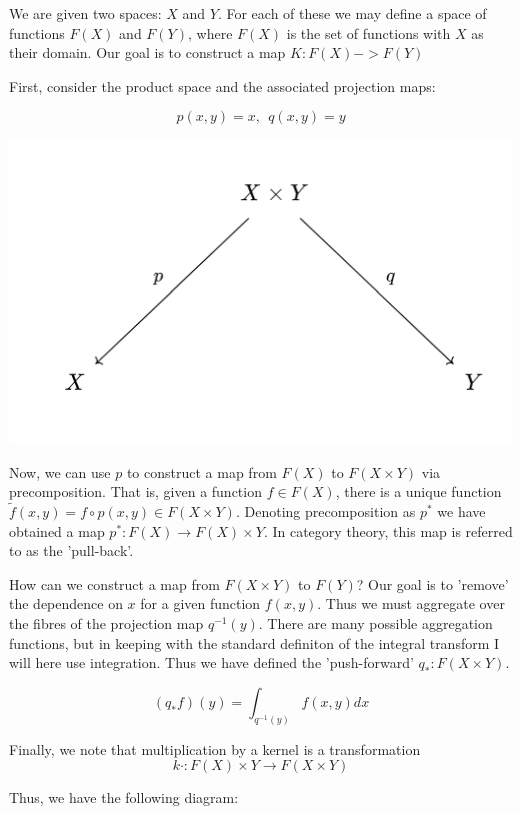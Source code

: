 \documentclass[11pt]{article}
\begin{document}
We are given two spaces: $X$ and $Y$. For each of these we may define a space of functions $F(X)$ and $F(Y)$, where $F(X)$ is the set of functions with $X$ as their domain. Our goal is to construct a map $K: F(X) -> F(Y)$

First, consider the product space and the associated projection maps:

$$ p(x, y) = x, \ \  q(x, y) = y$$

\pagebreak

\includegraphics[scale=0.4]{basic_span.png}

Now, we can use $p$ to construct a map from $F(X)$ to $F(X\times Y)$ via precomposition. That is, given a function $f \in F(X)$, there is a unique function $\tilde{f}(x,y) = f \circ p (x, y)  \in F(X \times Y)$. Denoting precomposition as $p^*$ we have obtained a map $p^*: F(X) \rightarrow F(X) \times Y$. In category theory, this map is referred to as the 'pull-back'.

How can we construct a map from $F(X \times Y)$ to $F(Y)$? Our goal is to 'remove' the dependence on $x$ for a given function $f(x, y)$. Thus we must aggregate over the fibres of the projection map $q^{-1}(y)$. There are many possible aggregation functions, but in keeping with the standard definiton of the integral transform I will here use integration. Thus we have defined the 'push-forward' $q_* : F(X \times Y)$.

$$ (q_* f)(y) = \int_{q^{-1}(y)} f(x, y) dx $$

Finally, we note that multiplication by a kernel is a transformation 
$$k \cdot : F(X) \times Y \rightarrow F(X \times Y)$$ 

Thus, we have the following diagram:
\end{document}
